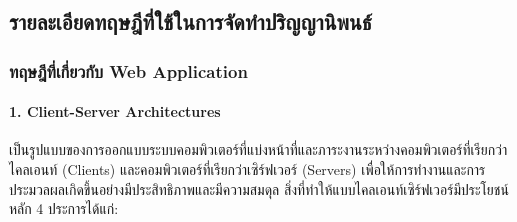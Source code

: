 \documentclass[12pt,a4paper]{article}
\begin{document}
    

\subsection{รายละเอียดทฤษฎีที่ใช้ในการจัดทำปริญญานิพนธ์}

\subsubsection{ทฤษฎีที่เกี่ยวกับ Web Application}

\paragraph{1. Client-Server Architectures} เป็นรูปแบบของการออกแบบระบบคอมพิวเตอร์ที่แบ่งหน้าที่และภาระงานระหว่างคอมพิวเตอร์ที่เรียกว่าไคลเอนท์ (Clients) และคอมพิวเตอร์ที่เรียกว่าเซิร์ฟเวอร์ (Servers) เพื่อให้การทำงานและการประมวลผลเกิดขึ้นอย่างมีประสิทธิภาพและมีความสมดุล สิ่งที่ทำให้แบบไคลเอนท์เซิร์ฟเวอร์มีประโยชน์หลัก 4 ประการได้แก่:
\end{document}
